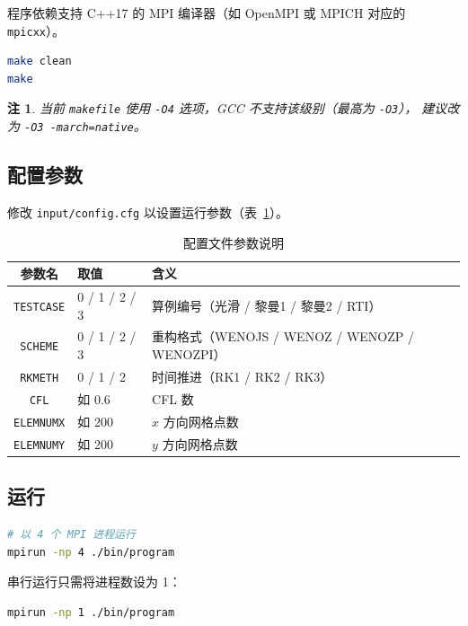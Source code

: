 \documentclass{article}
\newtheorem{remark}{注}
\numberwithin{equation}{section}
\begin{document}
程序依赖支持 C++17 的 MPI 编译器（如 OpenMPI 或 MPICH 对应的 \texttt{mpicxx}）。

\begin{lstlisting}[language=bash, numbers=none]
make clean
make
\end{lstlisting}

\begin{remark}
    当前 \texttt{makefile} 使用 \texttt{-O4} 选项，GCC 不支持该级别（最高为 \texttt{-O3}），
    建议改为 \texttt{-O3 -march=native}。
\end{remark}

\subsection{配置参数}

修改 \texttt{input/config.cfg} 以设置运行参数（表~\ref{tab:config}）。

\begin{table}[H]
\centering
\caption{配置文件参数说明}
\label{tab:config}
\begin{tabular}{cll}
\toprule
参数名 & 取值 & 含义 \\
\midrule
\texttt{TESTCASE} & 0 / 1 / 2 / 3 & 算例编号（光滑 / 黎曼1 / 黎曼2 / RTI）\\
\texttt{SCHEME}   & 0 / 1 / 2 / 3 & 重构格式（WENOJS / WENOZ / WENOZP / WENOZPI）\\
\texttt{RKMETH}   & 0 / 1 / 2     & 时间推进（RK1 / RK2 / RK3）\\
\texttt{CFL}      & 如 0.6        & CFL 数 \\
\texttt{ELEMNUMX} & 如 200        & $x$ 方向网格点数 \\
\texttt{ELEMNUMY} & 如 200        & $y$ 方向网格点数 \\
\bottomrule
\end{tabular}
\end{table}

\subsection{运行}

\begin{lstlisting}[language=bash, numbers=none]
# 以 4 个 MPI 进程运行
mpirun -np 4 ./bin/program
\end{lstlisting}

串行运行只需将进程数设为 1：
\begin{lstlisting}[language=bash, numbers=none]
mpirun -np 1 ./bin/program
\end{lstlisting}
\end{document}
